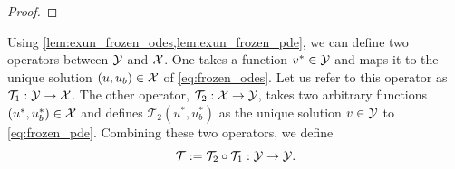 \begin{proof}


\end{proof}

Using \cref{lem:exun_frozen_odes,lem:exun_frozen_pde}, we can define two operators between $\mathcal{Y}$ and $\mathcal{X}$. One takes a function $v^* \in \mathcal{Y}$ and maps it to the unique solution $(u, u_b) \in \mathcal{X}$ of \cref{eq:frozen_odes}. Let us refer to this operator as $\mathcal{T}_{1}: \mathcal{Y} \to \mathcal{X}$. The other operator, $\mathcal{T}_{2}: \mathcal{X} \to \mathcal{Y}$, takes two arbitrary functions $(u^*, u_b^*) \in \mathcal{X}$ and defines $\mathcal{T}_{2}(u^*, u_b^*)$ as the unique solution $v \in \mathcal{Y}$ to \cref{eq:frozen_pde}. Combining these two operators, we define  
%
\begin{equation*}
    \mathcal{T} := \mathcal{T}_{2} \circ \mathcal{T}_{1} : \mathcal{Y} \to \mathcal{Y}.
\end{equation*}

